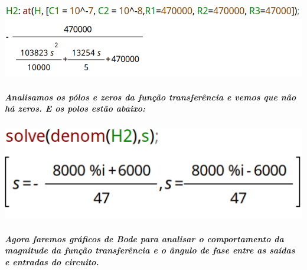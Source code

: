 \documentclass[12pt,twoside, a4paper, twocolumn]{article}
\begin{document}
\subparagraph*{}








\begin{adjustbox}{scale=0.34}
    \includegraphics{H2.png}
\end{adjustbox}








\subparagraph*{Analisamos os pólos e zeros da função transferência e vemos que não há zeros. E os polos estão abaixo:}




\subparagraph*{}




\begin{adjustbox}{scale=0.5}
    \includegraphics{H2denom.png}
\end{adjustbox}
















\subparagraph*{Agora faremos gráficos de Bode para analisar o comportamento da magnitude da função transferência e o ângulo de fase entre as saídas e entradas do circuito.}




\subparagraph*{}
\end{document}

